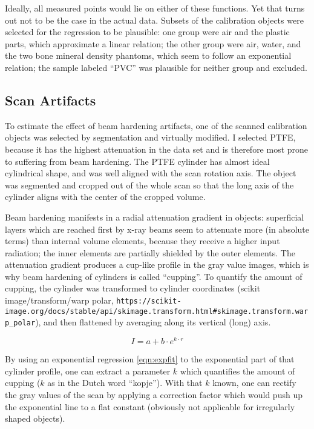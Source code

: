 Ideally, all measured points would lie on either of these functions.
Yet that turns out not to be the case in the actual data.
Subsets of the calibration objects were selected for the regression to be plausible: one group were air and the plastic parts, which approximate a linear relation; the other group were air, water, and the two bone mineral density phantoms, which seem to follow an exponential relation; the sample labeled ``PVC'' was plausible for neither group and excluded.


\subsection{Scan Artifacts}
\label{sec:org304e2b6}
To estimate the effect of beam hardening artifacts, one of the scanned calibration objects was selected by segmentation and virtually modified.
I selected PTFE, because it has the highest attenuation in the data set and is therefore most prone to suffering from beam hardening.
The PTFE cylinder has almost ideal cylindrical shape, and was well aligned with the scan rotation axis.
The object was segmented and cropped out of the whole scan so that the long axis of the cylinder aligns with the center of the cropped volume.


Beam hardening manifests in a radial attenuation gradient in objects: superficial layers which are reached first by x-ray beams seem to attenuate more (in absolute terms) than internal volume elements, because they receive a higher input radiation; the inner elements are partially shielded by the outer elements.
The attenuation gradient produces a cup-like profile in the gray value images, which is why beam hardening of cylinders is called ``cupping''.
To quantify the amount of cupping, the cylinder was transformed to cylinder coordinates (scikit image/transform/warp polar, \nolinkurl{https://scikit-image.org/docs/stable/api/skimage.transform.html#skimage.transform.warp_polar}), and then flattened by averaging along its vertical (long) axis.

\begin{equation}\label{eqn:expfit}
 I = a+b\cdot e^{k\cdot r}
\end{equation}

By using an exponential regression \eqref{eqn:expfit} to the exponential part of that cylinder profile, one can extract a parameter \(k\) which quantifies the amount of cupping (\(k\) as in the Dutch word ``kopje'').
With that \(k\) known, one can rectify the gray values of the scan by applying a correction factor which would push up the exponential line to a flat constant (obviously not applicable for irregularly shaped objects).

